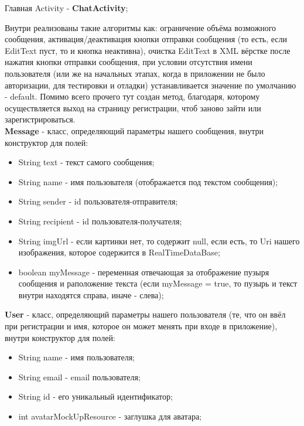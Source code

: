 \documentclass[utf8,14pt,a4paper,oneside,russian]{book}
\begin{document}
	Главная Activity - \textbf{ChatActivity};
	
	Внутри реализованы такие алгоритмы как: ограничение объёма возможного сообщения, активация/деактивация кнопки отправки сообщения (то есть, если EditText пуст, то и кнопка неактивна), очистка EditText в XML вёрстке после нажатия кнопки отправки сообщения, при условии отсутствия имени пользователя (или же на начальных этапах, когда в приложении не было авторизации, для тестировки и отладки) устанавливается значение по умолчанию - default. Помимо всего прочего тут создан метод, благодаря, которому осуществляется выход на страницу регистрации, чтоб заново зайти или зарегистрироваться.\\
	
	\textbf{Message} - класс, определяющий параметры нашего сообщения, внутри конструктор для полей:
	
	\begin{itemize}
	\item String text - текст самого сообщения;
	\item String name - имя пользователя (отображается под текстом сообщения);
	\item String sender - id пользователя-отправителя;
	\item String recipient - id пользователя-получателя;
	\item String imgUrl - если картинки нет, то содержит null, если есть, то Uri нашего изображения, которое содержится в RealTimeDataBase;
	\item boolean myMessage - переменная отвечающая за отображение пузыря сообщения и раположение текста (если myMessage = true, то пузырь и текст внутри находятся справа, иначе - слева);\\
	\end{itemize}

	 \textbf{User} - класс, определяющий параметры нашего пользователя (те, что он ввёл при регистрации и имя, которое он может менять при входе в приложение), внутри конструктор для полей:
	 
	 \begin{itemize}
	 	\item String name - имя пользователя;
	 	\item String email - email пользователя;
	 	\item String id - его уникальный идентификатор;
	 	\item int avatarMockUpResource - заглушка для аватара;\\
	 \end{itemize}
 
\end{document}
